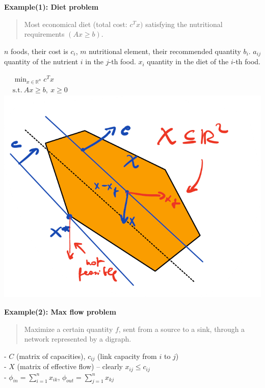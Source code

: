 \documentclass[a4paper]{article}
\begin{document}
\begin{multicols}{2}
    \noindent
    \textbf{Example(1): Diet problem}
    \begin{quote}Most economical diet (total cost: ${c^T{x}})$ satisfying the nutritional requirements $(Ax\ge{b})$.\end{quote}
    $n$ foods, their cost is $c_i$, $m$ nutritional element, their recommended quantity $b_i$. $a_{ij}$ quantity of the nutrient $i$ in the $j$-th food. $x_i$ quantity in the diet of the $i$-th food.
    \begin{center}
        $\begin{aligned}
            &\min_{x\in\mathbb{R}^n} c^T{x}\\
            &\text{s.t.} \ Ax \ge b, \ x\ge0
        \end{aligned}$\\
            \includegraphics[scale=0.3]{img/LP_fig.png}
    \end{center}
    \newcolumn
    \textbf{Example(2): Max flow problem}
    \vspace{-0.2cm}
    \begin{quote}Maximize a certain quantity $f$, sent from a source to a sink, through a network represented by a digraph.\end{quote}
    - $C$ (matrix of capacities), $c_{ij}$ (link capacity from $i$ to $j$)\\
    - $X$ (matrix of effective flow) -- clearly $x_{ij} \le c_{ij}$\\
    - $\phi_{in} = \sum_{i=1}^n{x_{ik}}$, $\phi_{out}=\sum_{j=1}^n{x_{kj}}$\\

\end{multicols}
\end{document}

